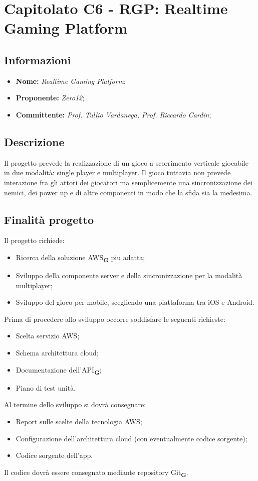 \section{Capitolato C6 - RGP: Realtime Gaming Platform}
\subsection{Informazioni}
\begin{itemize}
    \item \textbf{Nome:} \textit{Realtime Gaming Platform};
    \item \textbf{Proponente:} \textit{Zero12};
    \item \textbf{Committente:} \textit{Prof. Tullio Vardanega, Prof. Riccardo Cardin};
\end{itemize}
\subsection{Descrizione}
Il progetto prevede la realizzazione di un gioco a scorrimento verticale giocabile in due modalità: single player e multiplayer. Il gioco tuttavia non prevede interazione fra gli attori dei giocatori ma semplicemente una sincronizzazione dei nemici, dei power up e di altre componenti in modo che la sfida sia la medesima.
\subsection{Finalità progetto}
Il progetto richiede:
\begin{itemize}
    \item Ricerca della soluzione AWS\textsubscript{\textbf{G}} piu adatta;
    \item Sviluppo della componente server e della sincronizzazione per la modalità multiplayer;
    \item Sviluppo del gioco per mobile, scegliendo una piattaforma tra iOS e Android.
\end{itemize}
Prima di procedere allo sviluppo occorre soddisfare le seguenti richieste:
\begin{itemize}
    \item Scelta servizio AWS;
    \item Schema architettura cloud;
    \item Documentazione dell'API\textsubscript{\textbf{G}};
    \item Piano di test unità.
\end{itemize}
Al termine dello sviluppo si dovrà consegnare:
\begin{itemize}
    \item Report sulle scelte della tecnologia AWS;
    \item Configurazione dell'architettura cloud (con eventualmente codice sorgente);
    \item Codice sorgente dell'app.
\end{itemize}
Il codice dovrà essere consegnato mediante repository Git\textsubscript{\textbf{G}}.
